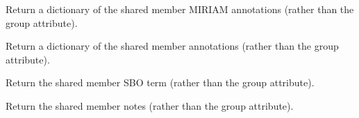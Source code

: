 \documentclass[letterpaper,12pt,english]{sphinxmanual}
\begin{document}
\begin{fulllineitems}
\begin{fulllineitems}
\end{fulllineitems}


\begin{fulllineitems}
\label{\detokenize{api/core:cbmpy.CBModel.Group.getSharedMIRIAMannotations}}
\pysigstartsignatures
\pysiglinewithargsret
{}
{}
{}
\pysigstopsignatures
\sphinxAtStartPar
Return a dictionary of the shared member MIRIAM annotations (rather than the
group attribute).

\end{fulllineitems}


\begin{fulllineitems}
\label{\detokenize{api/core:cbmpy.CBModel.Group.getSharedAnnotations}}
\pysigstartsignatures
\pysiglinewithargsret
{}
{}
{}
\pysigstopsignatures
\sphinxAtStartPar
Return a dictionary of the shared member annotations (rather than the group
attribute).

\end{fulllineitems}


\begin{fulllineitems}
\label{\detokenize{api/core:cbmpy.CBModel.Group.getSharedSBOterm}}
\pysigstartsignatures
\pysiglinewithargsret
{}
{}
{}
\pysigstopsignatures
\sphinxAtStartPar
Return the shared member SBO term (rather than the group attribute).

\end{fulllineitems}


\begin{fulllineitems}
\label{\detokenize{api/core:cbmpy.CBModel.Group.getSharedNotes}}
\pysigstartsignatures
\pysiglinewithargsret
{}
{}
{}
\pysigstopsignatures
\sphinxAtStartPar
Return the shared member notes (rather than the group attribute).


\end{fulllineitems}
\end{fulllineitems}
\end{document}
